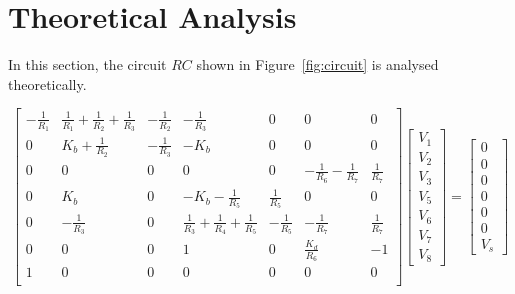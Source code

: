 \section{Theoretical Analysis}
\label{sec:analysis}

In this section, the circuit $RC$ shown in Figure~\ref{fig:circuit} is analysed
theoretically.




\[
  \begin{bmatrix}
    - \frac{1}{R_1} & \frac{1}{R_1} + \frac{1}{R_2} + \frac{1}{R_3} & -\frac{1}{R_2} & -\frac{1}{R_3}                                & 0              & 0                              & 0             \\
    0               & K_b + \frac{1}{R_2}                           & -\frac{1}{R_3} & - K_b                                         & 0              & 0                              & 0             \\
    0               & 0                                             & 0              & 0                                             & 0              & -\frac{1}{R_6} - \frac{1}{R_7} & \frac{1}{R_7} \\
    0               & K_b                                           & 0              & -K_b - \frac{1}{R_5}                          & \frac{1}{R_5}  & 0                              & 0             \\
    0               & -\frac{1}{R_3}                                & 0              & \frac{1}{R_3} + \frac{1}{R_4} + \frac{1}{R_5} & -\frac{1}{R_5} & -\frac{1}{R_7}                 & \frac{1}{R_7} \\
    0               & 0                                             & 0              & 1                                             & 0              & \frac{K_d}{R_6}                & -1            \\
    1               & 0                                             & 0              & 0                                             & 0              & 0                              & 0             \\
  \end{bmatrix}
  \begin{bmatrix}
    V_1 \\ V_2  \\ V_3 \\ V_5 \\ V_6 \\ V_7 \\ V_8
  \end{bmatrix}
  =
  \begin{bmatrix}
    0 \\ 0 \\ 0 \\ 0 \\ 0  \\ 0 \\ V_s
  \end{bmatrix}
\]

